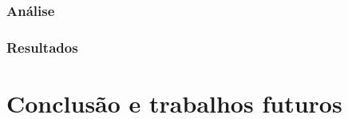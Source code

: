\documentclass[a4paper]{article}
\begin{document}
\subsubsection{Análise}
\lipsum[10]
\lipsum[10]
\lipsum[10]
\lipsum[10]
\subsubsection{Resultados}
\lipsum[10]
\lipsum[10]
\lipsum[10]
\lipsum[10]

\section{Conclusão e trabalhos futuros}

\lipsum[10]
\lipsum[10]
\lipsum[10]
\lipsum[10]
\lipsum[10]
\lipsum[10]
\lipsum[10]
\lipsum[10]
\lipsum[10]



\end{document}
